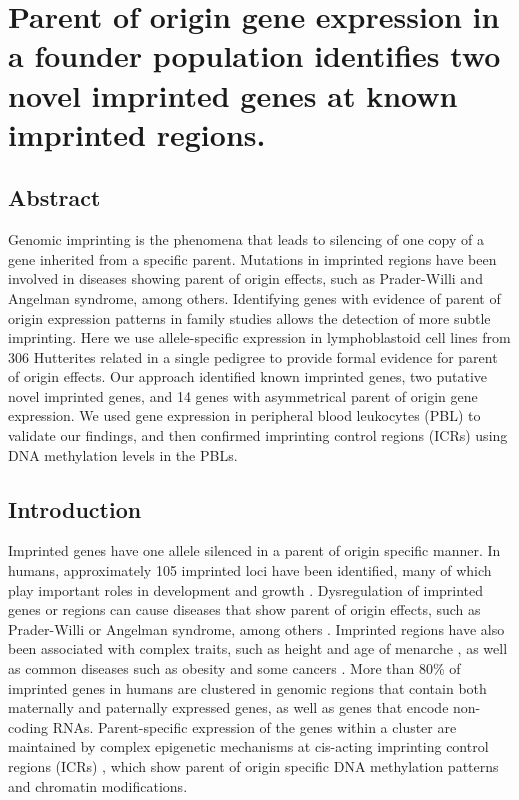 \chapter{Parent of origin gene expression in a founder population identifies two novel imprinted genes at known imprinted regions.}\label{ch:imprinted}
\section[Abstract]{Abstract\footnotemark}


Genomic imprinting is the phenomena that leads to silencing of one copy of a gene inherited from a specific parent. Mutations in imprinted regions have been involved in diseases showing parent of origin effects, such as Prader-Willi and Angelman syndrome, among others. Identifying genes with evidence of parent of origin expression patterns in family studies allows the detection of more subtle imprinting. Here we use allele-specific expression in lymphoblastoid cell lines from 306 Hutterites related in a single pedigree to provide formal evidence for parent of origin effects. Our approach identified known imprinted genes, two putative novel imprinted genes, and 14 genes with asymmetrical parent of origin gene expression. We used gene expression in peripheral blood leukocytes (PBL) to validate our findings, and then confirmed imprinting control regions (ICRs) using DNA methylation levels in the PBLs.



\section{Introduction}\label{ch03-introduction}
	Imprinted genes have one allele silenced in a parent of origin specific manner. In humans, approximately 105 imprinted loci have been identified, many of which play important roles in development and growth \cite{Falls1999,Peters2014}. Dysregulation of imprinted genes or regions can cause diseases that show parent of origin effects, such as Prader-Willi or Angelman syndrome, among others \cite{Peters2014}. Imprinted regions have also been associated with complex traits, such as height and age of menarche \cite{Benonisdottir:2016dz,Zoledziewska:2015do}, as well as common diseases such as obesity and some cancers \cite{Peters2014}. More than 80\% of imprinted genes in humans are clustered in genomic regions that contain both maternally and paternally expressed genes, as well as genes that encode non-coding RNAs. Parent-specific expression of the genes within a cluster are maintained by complex epigenetic mechanisms at cis-acting imprinting control regions (ICRs) \cite{Kalish:2014gd}, which show parent of origin specific DNA methylation patterns and chromatin modifications.
	
